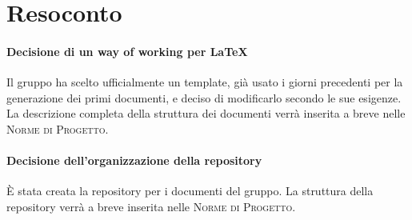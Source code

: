 \documentclass{article}
\begin{document}
\section{Resoconto}%
\label{resoconto}
\paragraph*{Decisione di un way of working per \LaTeX}
Il gruppo ha scelto ufficialmente un template, già usato i giorni precedenti per la generazione dei primi documenti, e deciso di modificarlo secondo le sue esigenze. La descrizione completa della struttura dei documenti verrà inserita a breve nelle \textsc{Norme di Progetto}. \\

\paragraph*{Decisione dell'organizzazione della repository}
È stata creata la repository per i documenti del gruppo. La struttura della repository verrà a breve inserita nelle \textsc{Norme di Progetto}.
\end{document}
